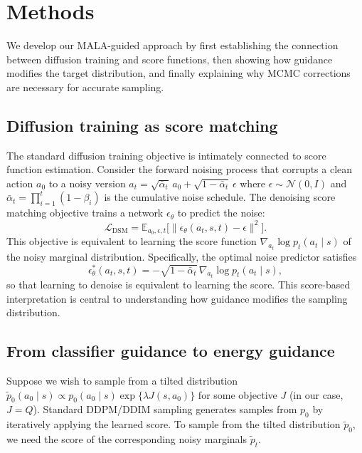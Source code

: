 \documentclass{article}
\theoremstyle{plain}
\theoremstyle{definition}
\theoremstyle{remark}
\newcommand{\E}{\mathbb{E}}
\begin{document}
\section{Methods}
\label{sec:methods}

We develop our MALA-guided approach by first establishing the connection between diffusion training and score functions, then showing how guidance modifies the target distribution, and finally explaining why MCMC corrections are necessary for accurate sampling.

\subsection{Diffusion training as score matching}
\label{sec:score-matching}

The standard diffusion training objective is intimately connected to score function estimation.
Consider the forward noising process that corrupts a clean action $a_0$ to a noisy version $a_t = \sqrt{\bar{\alpha}_t}\, a_0 + \sqrt{1-\bar{\alpha}_t}\, \epsilon$ where $\epsilon \sim \mathcal{N}(0,I)$ and $\bar{\alpha}_t = \prod_{i=1}^t (1-\beta_i)$ is the cumulative noise schedule.
The denoising score matching objective trains a network $\epsilon_\theta$ to predict the noise:
\begin{equation}
  \mathcal{L}_{\text{DSM}} = \E_{a_0, \epsilon, t}\bigl[\|\epsilon_\theta(a_t, s, t) - \epsilon\|^2\bigr].
  \label{eq:dsm}
\end{equation}
This objective is equivalent to learning the score function $\nabla_{a_t} \log p_t(a_t \mid s)$ of the noisy marginal distribution.
Specifically, the optimal noise predictor satisfies
\begin{equation}
  \epsilon_\theta^*(a_t, s, t) = -\sqrt{1-\bar{\alpha}_t}\, \nabla_{a_t} \log p_t(a_t \mid s),
  \label{eq:score-noise}
\end{equation}
so that learning to denoise is equivalent to learning the score.
This score-based interpretation is central to understanding how guidance modifies the sampling distribution.

\subsection{From classifier guidance to energy guidance}
\label{sec:classifier-guidance}

Suppose we wish to sample from a tilted distribution $\tilde{p}_0(a_0 \mid s) \propto p_0(a_0 \mid s) \exp\{\lambda J(s, a_0)\}$ for some objective $J$ (in our case, $J = Q$).
Standard DDPM/DDIM sampling generates samples from $p_0$ by iteratively applying the learned score.
To sample from the tilted distribution $\tilde{p}_0$, we need the score of the corresponding noisy marginals $\tilde{p}_t$.
\end{document}
